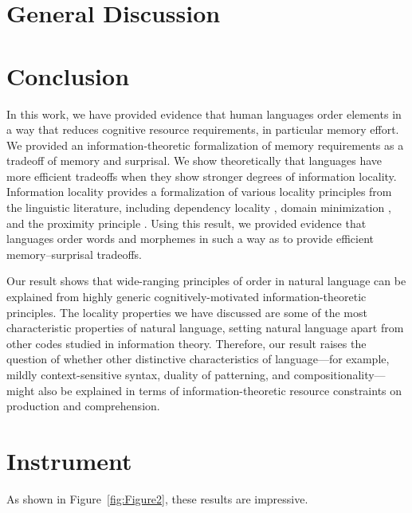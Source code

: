 \documentclass[man]{apa7}
\newcommand{\citep}{\parencite}
\begin{document}
\section{General Discussion}




\section{Conclusion}

In this work, we have provided evidence that human languages order elements in a way that reduces cognitive resource requirements, in particular memory effort.
We provided an information-theoretic formalization of memory requirements as a tradeoff of memory and surprisal.
We show theoretically that languages have more efficient tradeoffs when they show stronger degrees of information locality.
Information locality provides a formalization of various locality principles from the linguistic literature, including dependency locality \citep{gibson1998linguistic}, domain minimization \citep{hawkins2004efficiency}, and the proximity principle \citep{givon1985iconicity}.
Using this result, we provided evidence that languages order words and morphemes in such a way as to provide efficient memory--surprisal tradeoffs.

Our result shows that wide-ranging principles of order in natural language can be explained from highly generic cognitively-motivated information-theoretic principles. The locality properties we have discussed are some of the most characteristic properties of natural language, setting natural language apart from other codes studied in information theory.
Therefore, our result raises the question of whether other distinctive characteristics of language---for example, mildly context-sensitive syntax, duality of patterning, and compositionality---might also be explained in terms of information-theoretic resource constraints on production and comprehension.






\printbibliography

\appendix

\section{Instrument}
\label{app:instrument}

As shown in Figure~\ref{fig:Figure2}, these results are impressive. \lipsum[20]
\end{document}
